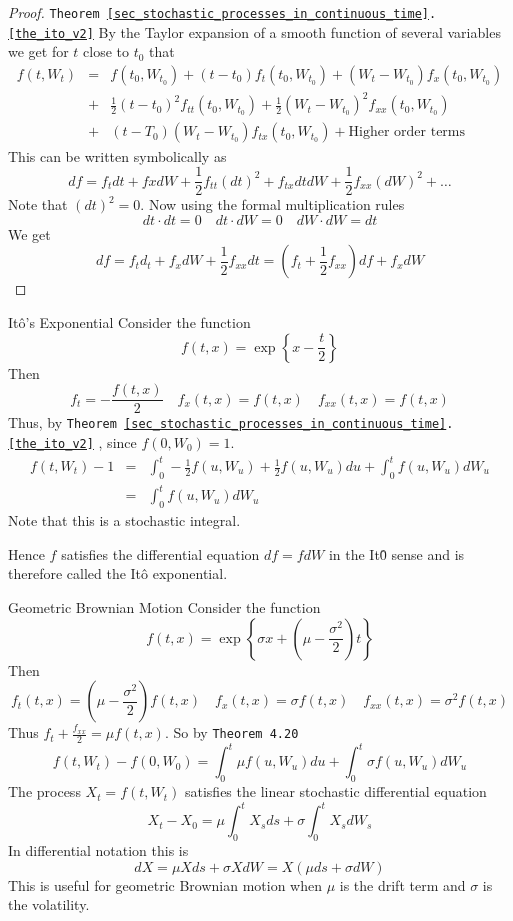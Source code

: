 \documentclass[11pt,a4paper]{article}
\begin{document}
  \begin{proof}{\texttt{Theorem \ref{sec_stochastic_processes_in_continuous_time}.\ref{the_ito_v2}}}
    By the Taylor expansion of a smooth function of several variables we get for $t$ close to $t_0$ that
    \[\begin{array}{rcl}
      f(t,W_t)&=&f(t_0,W_{t_0})+(t-t_0)f_t(t_0,W_{t_0})+(W_t-W_{t_0})f_x(t_0,W_{t_0})\\
      &+&\frac12(t-t_0)^2f_{tt}(t_0,W_{t_0})+\frac12(W_t-W_{t_0})^2f_{xx}(t_0,W_{t_0})\\
      &+&(t-T_0)(W_t-W_{t_0})f_{tx}(t_0,W_{t_0})+\text{Higher order terms}
    \end{array}\]
    This can be written symbolically as
    \[ df=f_tdt+fxdW+\frac12f_{tt}(dt)^2+f_{tx}dtdW+\frac12f_{xx}(dW)^2+\dots \]
    Note that $(dt)^2=0$. Now using the formal multiplication rules
    \[ dt\cdot dt=0\quad dt\cdot dW=0\quad dW\cdot dW=dt \]
    We get
    \[ df=f_td_t+f_xdW+\frac12f_{xx}dt=(f_t+\frac12f_{xx})df+f_xdW \]
  \end{proof}

  \begin{example}{It\^o's Exponential}
    Consider the function
    \[ f(t,x)=\exp\left\{x-\frac{t}2\right\} \]
    Then
    \[ f_t=-\frac{f(t,x)}2\quad f_x(t,x)=f(t,x)\quad f_{xx}(t,x)=f(t,x) \]
    Thus, by \texttt{Theorem \ref{sec_stochastic_processes_in_continuous_time}.\ref{the_ito_v2}} , since $f(0,W_0)=1$.
    \[\begin{array}{rcl}
      f(t,W_t)-1&=&\int_0^t-\frac12f(u,W_u)+\frac12 f(u,W_u)du+\int_0^tf(u,W_u)dW_u\\
      &=&\int_0^tf(u,W_u)dW_u
    \end{array}\]
    Note that this is a stochastic integral.
    \par Hence $f$ satisfies the differential equation $df=fdW$ in the It\^0 sense and is therefore called the It\^o exponential.
  \end{example}

  \begin{example}{Geometric Brownian Motion}\label{exp_geometric_brownian_motion}
    Consider the function
    \[ f(t,x)=\exp\left\{\sigma x+(\mu-\frac{\sigma^2}2)t\right\} \]
    Then
    \[ f_t(t,x)=\left(\mu-\frac{\sigma^2}2\right)f(t,x)\quad f_x(t,x)=\sigma f(t,x)\quad f_{xx}(t,x)=\sigma^2f(t,x) \]
    Thus $f_t+\frac{f_{xx}}2=\mu f(t,x)$. So by \texttt{Theorem 4.20}
    \[ f(t,W_t)-f(0,W_0)=\int_0^t\mu f(u,W_u)du+\int_0^t\sigma f(u,W_u)dW_u \]
    The process $X_t=f(t,W_t)$ satisfies the linear stochastic differential equation
    \[ X_t-X_0=\mu\int_0^tX_sds+\sigma\int_0^tX_sdW_s \]
    In differential notation this is
    \[ dX=\mu Xds+\sigma XdW=X(\mu ds+\sigma dW) \]
    This is useful for geometric Brownian motion when $\mu$ is the drift term and $\sigma$ is the volatility.
  \end{example}
\end{document}
